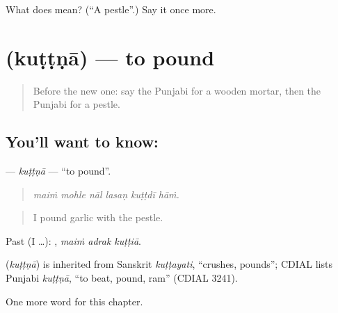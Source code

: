 \begin{tcolorbox}[breakable,colback=teal!4,colframe=teal!35!black,title={Before you move on}]
What does  mean? (\textquotedblleft{}A pestle\textquotedblright{}.) Say it once more.
\end{tcolorbox}
\section[\texorpdfstring{\pa{ਕੁੱਟਣਾ} (kuṭṭṇā)}{ਕੁੱਟਣਾ (kuṭṭṇā)}]{ (kuṭṭṇā) — to pound}

\label{lesson:PA-C240-kuttna}



\begin{quote}
Before the new one: say the Punjabi for a wooden mortar, then the Punjabi for a pestle.
\end{quote}

\subsection*{You'll want to know: }
\textbf{} — \emph{kuṭṭṇā} — \textquotedblleft{}to pound\textquotedblright{}.

\begin{quote}
     
\end{quote}

\begin{quote}
\emph{maiṁ mohle nāl lasaṇ kuṭṭdī hāṁ.}
\end{quote}

\begin{quote}
I pound garlic with the pestle.
\end{quote}

Past (I …):   , \emph{maiṁ adrak kuṭṭiā}.

\begin{cousinweb}
\textbf{} (\emph{kuṭṭṇā}) is inherited from Sanskrit \emph{kuṭṭayati}, \textquotedblleft{}crushes, pounds\textquotedblright{}; CDIAL lists Punjabi \emph{kuṭṭṇā}, \textquotedblleft{}to beat, pound, ram\textquotedblright{} (CDIAL 3241).
\end{cousinweb}

\begin{grammarlens}[title={What you've built}]
One more word for this chapter.
\end{grammarlens}

